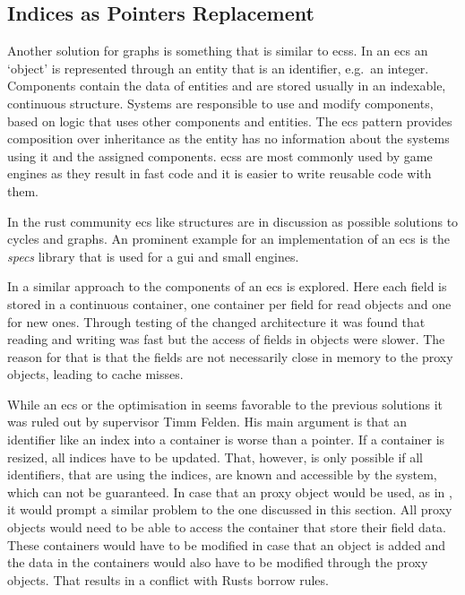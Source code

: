 \documentclass[thesis]{subfiles}
\begin{document}
  \subsection{Indices as Pointers Replacement}
    Another solution for graphs is something that is similar to \glspl{ecs}.
    In an \gls{ecs} an `object' is represented through an entity that is an identifier, e.g.~an integer.
    Components contain the data of entities and are stored usually in an indexable, continuous structure.
    Systems are responsible to use and modify components, based on logic that uses other components and entities.\autocite[209]{sfml}
    The \gls{ecs} pattern provides composition over inheritance as the entity has no information about the systems using it and the assigned components.
    \glspl{ecs} are most commonly used by game engines as they result in fast code and it is easier to write reusable code with them\autocites[209]{sfml}{ecs-acc-game}{ecs-hash}.

    In the rust community \gls{ecs} like structures are in discussion as possible solutions to cycles and graphs\autocites{rust-graph-r4cpp}{rust-graph-leipzig}{rust-graph-niko}{rust-graph-exyr}.
    An prominent example for an implementation of an \gls{ecs} is the \emph{specs}\autocite{rust-specs} library that is used for a \gls{gui}\autocite{rust-xi} and small engines\autocites{rust-amethyst}{rust-rhusics}.

    In \autocite{skill-scala} a similar approach to the components of an \gls{ecs} is explored.
    Here each field is stored in a continuous container, one container per field for read objects and one for new ones.
    Through testing of the changed architecture it was found that reading and writing was fast but the access of fields in objects were slower.
    The reason for that is that the fields are not necessarily close in memory to the proxy objects, leading to cache misses.
    \autocite{skill-scala}

    While an \gls{ecs} or the optimisation in \autocite{skill-scala} seems favorable to the previous solutions it was ruled out by supervisor Timm Felden.
    His main argument is that an identifier like an index into a container is worse than a pointer.
    If a container is resized, all indices have to be updated.
    That, however, is only possible if all identifiers, that are using the indices, are known and accessible by the system, which can not be guaranteed.
    In case that an proxy object would be used, as in \autocite{skill-scala}, it would prompt a similar problem to the one discussed in this section.
    All proxy objects would need to be able to access the container that store their field data.
    These containers would have to be modified in case that an object is added and the data in the containers would also have to be modified through the proxy objects.
    That results in a conflict with Rusts borrow rules.
\end{document}
